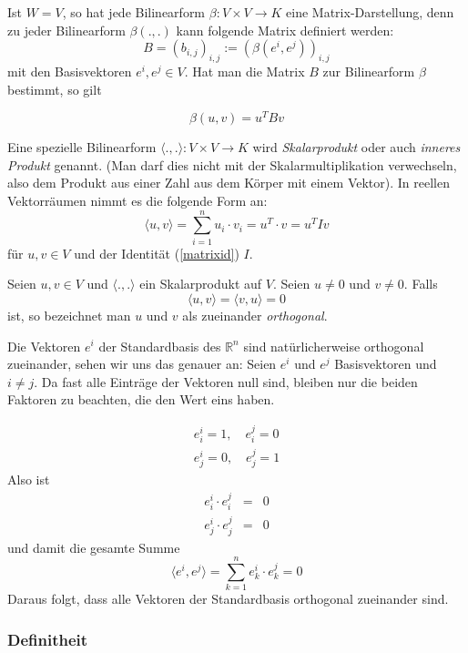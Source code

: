 Ist $W=V$, so hat jede Bilinearform $\beta:V\times V\longrightarrow K$ eine Matrix-Darstellung, denn zu jeder Bilinearform $\beta(.,.)$ kann folgende Matrix definiert werden:
\[
B = (b_{i,j})_{i,j} := (\beta(e^i, e^j))_{i,j}
\]
mit den Basisvektoren $e^i, e^j\in V$. Hat man die Matrix $B$ zur Bilinearform $\beta$ bestimmt, so gilt 

\[
\beta(u,v) = u^T B v
\]


\begin{definition}
Eine spezielle Bilinearform $\langle .,.\rangle : V\times V \longrightarrow K$ wird \textsl{Skalarprodukt} oder auch \textsl{inneres Produkt} genannt. (Man darf dies nicht mit der Skalarmultiplikation verwechseln, also dem Produkt aus einer Zahl aus dem Körper mit einem Vektor). In reellen Vektorräumen nimmt es die folgende Form an:
\[
\langle u,v \rangle = \sum_{i=1}^{n} u_i\cdot v_i = u^T \cdot v = u^T I v
\]
für $u,v \in V$ und der Identität (\ref{matrixid}) $I$.
\end{definition}

\begin{definition}
Seien $u,v \in V$ und $\langle .,.\rangle$ ein Skalarprodukt auf $V$. Seien $u\ne 0$ und $v\ne 0$. Falls 
\[ \langle u,v \rangle = \langle v,u \rangle = 0\]
ist, so bezeichnet man $u$ und $v$ als zueinander \textsl{orthogonal}. 
\end{definition}

Die Vektoren $e^i$ der Standardbasis des $\mathbb{R}^n$ sind natürlicherweise orthogonal zueinander, sehen wir uns das genauer an: Seien $e^i$ und $e^j$ Basisvektoren und $i\ne j$. Da fast alle Einträge der Vektoren null sind, bleiben nur die beiden Faktoren zu beachten, die den Wert eins haben. 

\begin{eqnarray*}
e^i_i = 1, \quad e^j_i = 0 \\
e^i_j = 0, \quad e^j_j = 1
\end{eqnarray*}
Also ist 
\begin{eqnarray*}
e^i_i \cdot e^j_i &=& 0 \\
e^i_j \cdot e^j_j &=& 0 
\end{eqnarray*}
und damit die gesamte Summe 
\[
\langle e^i, e^j\rangle = \sum_{k=1}^{n} e^i_k \cdot e^j_k = 0
\]
Daraus folgt, dass alle Vektoren der Standardbasis orthogonal zueinander sind.


\subsubsection{Definitheit}


